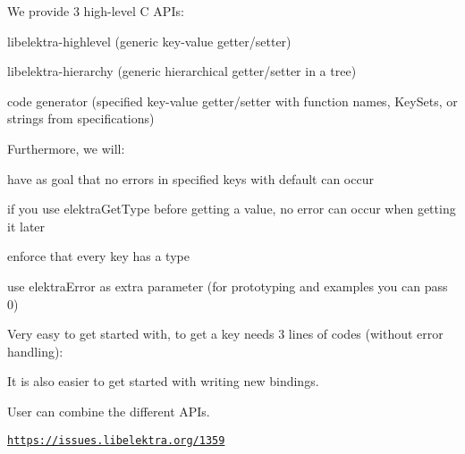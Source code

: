 We provide 3 high-\/level C A\+P\+Is\+:


\begin{DoxyEnumerate}
\item libelektra-\/highlevel (generic key-\/value getter/setter)
\item libelektra-\/hierarchy (generic hierarchical getter/setter in a tree)
\item code generator (specified key-\/value getter/setter with function names, Key\+Sets, or strings from specifications)
\end{DoxyEnumerate}

Furthermore, we will\+:


\begin{DoxyItemize}
\item have as goal that no errors in specified keys with default can occur
\item if you use {\ttfamily elektra\+Get\+Type} before getting a value, no error can occur when getting it later
\item enforce that every key has a type
\item use {\ttfamily elektra\+Error} as extra parameter (for prototyping and examples you can pass 0)
\end{DoxyItemize}


\begin{DoxyEnumerate}
\item Very easy to get started with, to get a key needs 3 lines of codes (without error handling)\+:
\end{DoxyEnumerate}





\begin{DoxyEnumerate}
\item It is also easier to get started with writing new bindings.
\item User can combine the different A\+P\+Is.
\end{DoxyEnumerate}

\href{https://issues.libelektra.org/1359}{\tt https\+://issues.\+libelektra.\+org/1359} 